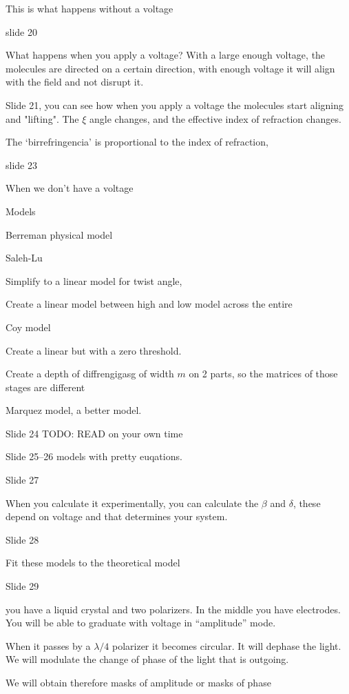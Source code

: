 \documentclass[../main/main.tex]{subfiles}
\begin{document}
This is what happens without a voltage

slide 20

What happens when you apply a voltage? With a large enough voltage, the molecules are directed on a certain direction, with enough voltage it will align with the field and not disrupt it.

Slide 21, you can see how when you apply a voltage the molecules start aligning and "lifting". The $\xi$ angle changes, and the effective index of refraction changes.

The `birrefringencia' is proportional to the index of refraction,

slide 23

When we don't have a voltage

Models

Berreman physical model

Saleh-Lu

Simplify to a linear model for twist angle,

Create a linear model between high and low model across the entire

Coy model

Create a linear but with a zero threshold.

Create a depth of diffrengigasg of width $m$ on 2 parts, so the matrices of those stages are different

Marquez model, a better model.

Slide 24 TODO: READ on your own time

Slide 25--26 models with pretty euqations.

Slide 27

When you calculate it experimentally, you can calculate the $\beta$ and $\delta$, these depend on voltage and that determines your system.

Slide 28

Fit these models to the theoretical model

Slide 29

you have a liquid crystal and two polarizers. In the middle you have electrodes. You will be able to graduate with voltage in ``amplitude'' mode.

When it passes by a $\lambda/4$ polarizer it becomes circular. It will dephase the light. We will modulate the change of phase of the light that is outgoing.

We will obtain therefore masks of amplitude or masks of phase
\end{document}
